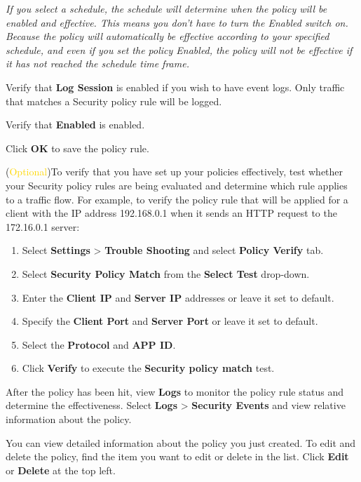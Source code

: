 \begin{description}
    
    \notemark\textit{If you select a schedule, the schedule will determine when the policy will be enabled and effective. 
    This means you don’t have to turn the Enabled switch on. Because the policy will automatically be effective according to your specified schedule, 
    and even if you set the policy Enabled, the policy will not be effective if it has not reached the schedule time frame.}
    \item[STEP 11.]	Verify that \textbf{Log Session} is enabled if you wish to have event logs. Only traffic that matches a Security policy rule will be logged. 
    \item[STEP 12.]	Verify that \textbf{Enabled} is enabled.
    \item[STEP 13.]	Click \textbf{OK} to save the policy rule.
    \item[STEP 14.]	(\textcolor{gold}{Optional})To verify that you have set up your policies effectively, test whether your Security policy rules are being evaluated 
    and determine which rule applies to a traffic flow. For example, to verify the policy rule that will be applied for a client with the IP address 192.168.0.1 
    when it sends an HTTP request to the 172.16.0.1 server:
    \begin{enumerate} 
        \item Select \textbf{Settings} > \textbf{Trouble Shooting} and select \textbf{Policy Verify} tab.
        \item Select \textbf{Security Policy Match} from the \textbf{Select Test} drop-down. 
        \item Enter the \textbf{Client IP} and \textbf{Server IP} addresses or leave it set to default.
        \item Specify the \textbf{Client Port} and \textbf{Server Port} or leave it set to default.
        \item Select the \textbf{Protocol} and \textbf{APP ID}. 
        \item Click \textbf{Verify} to execute the \textbf{Security policy match} test.
    \end{enumerate}
    \item[STEP 15.]	After the policy has been hit, view \textbf{Logs} to monitor the policy rule status and determine the effectiveness. 
    Select \textbf{Logs} > \textbf{Security Events} and view relative information about the policy.
\end{description}

You can view detailed information about the policy you just created. To edit and delete the policy, find the item you want to edit or delete in the list. Click \textbf{Edit} or \textbf{Delete} at the top left.


